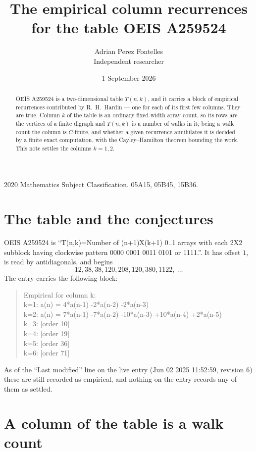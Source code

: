 \documentclass[11pt,a4paper]{article}
\title{The empirical column recurrences for the table OEIS A259524}
\author{Adrian Perez Fontelles\\ \small Independent researcher}
\date{1 September 2026}
\theoremstyle{plain}
\theoremstyle{definition}
\begin{document}
\maketitle

\begin{abstract}
OEIS A259524 is a two-dimensional table $T(n,k)$, and it carries a block of empirical
recurrences contributed by R.~H.~Hardin --- one for each of its first few columns. They are
true. Column $k$ of the table is an ordinary fixed-width array count, so its rows are the
vertices of a finite digraph and $T(n,k)$ is a number of walks in it; being a walk count the
column is $C$-finite, and whether a given recurrence annihilates it is decided by a finite
exact computation, with the Cayley--Hamilton theorem bounding the work. This note settles the columns $k=1, 2$.
\end{abstract}

\noindent\small 2020 Mathematics Subject Classification. 05A15, 05B45, 15B36.\normalsize

\section{The table and the conjectures}

OEIS A259524 is ``T(n,k)=Number of (n+1)X(k+1) 0..1 arrays with each 2X2 subblock having clockwise pattern 0000 0001 0011 0101 or 1111.''. It has offset $1$, is
read by antidiagonals, and begins
\[
12, 38, 38, 120, 208, 120, 380, 1122,\ \dots
\]
The entry carries the following block:
\begin{quote}\small
Empirical for column k:\\
k=1: a(n) = 4*a(n-1) -2*a(n-2) -2*a(n-3)\\
k=2: a(n) = 7*a(n-1) -7*a(n-2) -10*a(n-3) +10*a(n-4) +2*a(n-5)\\
k=3: [order 10]\\
k=4: [order 19]\\
k=5: [order 36]\\
k=6: [order 71]\\
\end{quote}
As of the ``Last modified'' line on the live entry (Jun 02 2025 11:52:59, revision 6) these are still
recorded as empirical, and nothing on the entry records any of them as settled.

\section{A column of the table is a walk count}
\end{document}
